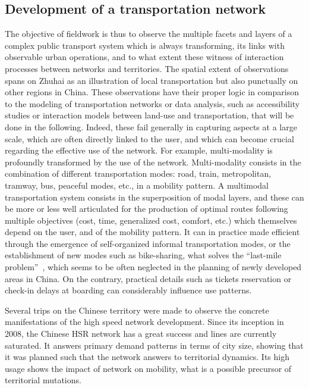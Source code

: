 \subsection{Development of a transportation network}

The objective of fieldwork is thus to observe the multiple facets and layers of a complex public transport system which is always transforming, its links with observable urban operations, and to what extent these witness of interaction processes between networks and territories. The spatial extent of observations spans on Zhuhai as an illustration of local transportation but also punctually on other regions in China. These observations have their proper logic in comparison to the modeling of transportation networks or data analysis, such as accessibility studies or interaction models between land-use and transportation, that will be done in the following. Indeed, these fail generally in capturing aspects at a large scale, which are often directly linked to the user, and which can become crucial regarding the effective use of the network. For example, multi-modality is profoundly transformed by the use of the network. Multi-modality consists in the combination of different transportation modes: road, train, metropolitan, tramway, bus, peaceful modes, etc., in a mobility pattern. A multimodal transportation system consists in the superposition of modal layers, and these can be more or less well articulated for the production of optimal routes following multiple objectives (cost, time, generalized cost, comfort, etc.) which themselves depend on the user, and of the mobility pattern. It can in practice made efficient through the emergence of self-organized informal transportation modes, or the establishment of new modes such as bike-sharing, what solves the ``last-mile problem''~\citep{liu2012solving}, which seems to be often neglected in the planning of newly developed areas in China. On the contrary, practical details such as tickets reservation or check-in delays at boarding can considerably influence use patterns.


Several trips on the Chinese territory were made to observe the concrete manifestations of the high speed network development. Since its inception in 2008, the Chinese HSR network has a great success and lines are currently saturated. It answers primary demand patterns in terms of city size, showing that it was planned such that the network answers to territorial dynamics. Its high usage shows the impact of network on mobility, what is a possible precursor of territorial mutations.

